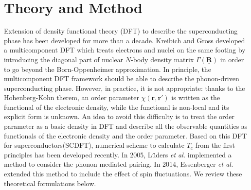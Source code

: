 

%
%
\chapter{Theory and Method}
\label{theory}
%
%
%
%
Extension of density functional theory\cite{HK1964,KS1965} (DFT) to describe the superconducting phase 
has been developed for more than a decade.
Kreibich and Gross\cite{Kreibich2001} developed a multicomponent DFT which treats electrons and 
nuclei on the same footing by introducing the diagonal part of nuclear $N$-body density matrix 
$\Gamma(\underline{\bm R})$ in order to go beyond the Born-Oppenheimer approximation.
In principle, the multicomponent DFT framework should be able to describe the phonon-driven 
superconducting phase. However, in practice, it is not appropriate: thanks to the 
Hohenberg-Kohn therem\cite{HK1964}, an order parameter $\chi(\bm r, \bm r')$ is written as the 
functional of the electronic density, while the functional is non-local and its explicit form 
is unknown. An idea to avoid this difficulty 
is to treat the order parameter as a basic density in DFT and describe all the observable quantities
as functionals of the electronic density and the order parameter\cite{Oliveira1988}.
Based on this DFT for superconductors(SCDFT), numerical scheme to calculate $T_c$ from the
first principles has been developed recently. In 2005, L\"{u}ders {\it et al.} implemented a 
method to consider the phonon mediated pairing\cite{Luders2005}. In 2014, Essenberger {\it et al.}
extended this method to include the effect of spin fluctuations\cite{Essenberger2014}.
We review these theoretical formulations below.

